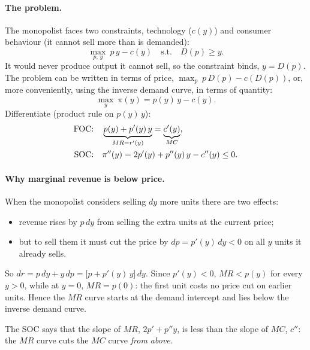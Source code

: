 \paragraph{The problem.} The monopolist faces two constraints, technology ($c(y)$) and consumer behaviour (it cannot sell more than is demanded):
\[
\max_{p,\,y}\ p\,y-c(y)\quad\text{s.t.}\quad D(p)\ge y .
\]
It would never produce output it cannot sell, so the constraint binds, $y=D(p)$. The problem can be written in terms of price, $\max_p\ p\,D(p)-c(D(p))$, or, more conveniently, using the inverse demand curve, in terms of quantity:
\begin{equation}\label{eq:micro-monop}
\max_y\ \pi(y)=p(y)\,y-c(y).
\end{equation}
Differentiate (product rule on $p(y)\,y$):
\begin{align}
\text{FOC:}\quad & \underbrace{p(y)+p'(y)\,y}_{MR=r'(y)}=\underbrace{c'(y)}_{MC}, \label{eq:micro-mrmc}\\
\text{SOC:}\quad & \pi''(y)=2p'(y)+p''(y)\,y-c''(y)\le 0. \notag
\end{align}

\paragraph{Why marginal revenue is below price.} When the monopolist considers selling $dy$ more units there are two effects:
\begin{itemize}
\item revenue rises by $p\,dy$ from selling the extra units at the current price;
\item but to sell them it must cut the price by $dp=p'(y)\,dy<0$ on all $y$ units it already sells.
\end{itemize}
So $dr=p\,dy+y\,dp=\big[p+p'(y)\,y\big]\,dy$. Since $p'(y)<0$, $MR<p(y)$ for every $y>0$, while at $y=0$, $MR=p(0)$: the first unit costs no price cut on earlier units. Hence the $MR$ curve starts at the demand intercept and lies below the inverse demand curve.

The SOC says that the slope of $MR$, $2p'+p''y$, is less than the slope of $MC$, $c''$: the $MR$ curve cuts the $MC$ curve \emph{from above}.

